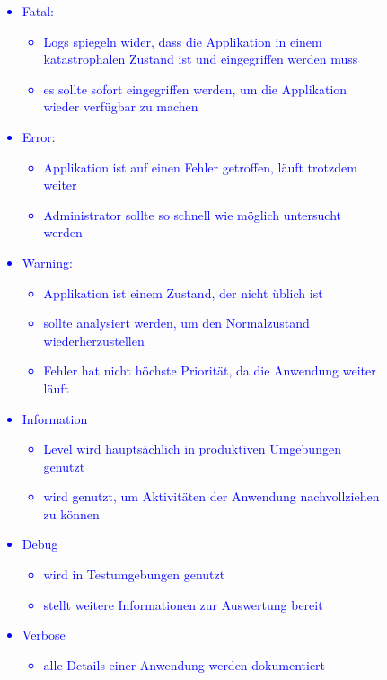 \begin{figure}[!h]
    \centering
    \textcolor{blue}{
        \begin{itemize}
            \item Fatal:
            \begin{itemize}
                \item Logs spiegeln wider, dass die Applikation in einem katastrophalen Zustand ist und eingegriffen werden muss
                \item es sollte sofort eingegriffen werden, um die Applikation wieder verfügbar zu machen
            \end{itemize}
            \item Error:
            \begin{itemize}
                \item Applikation ist auf einen Fehler getroffen, läuft trotzdem weiter
                \item Administrator sollte so schnell wie möglich untersucht werden
            \end{itemize}
            \item Warning:
            \begin{itemize}
                \item Applikation ist einem Zustand, der nicht üblich ist
                \item sollte analysiert werden, um den Normalzustand wiederherzustellen
                \item Fehler hat nicht höchste Priorität, da die Anwendung weiter läuft
            \end{itemize}
            \item Information
            \begin{itemize}
                \item Level wird hauptsächlich in produktiven Umgebungen genutzt
                \item wird genutzt, um Aktivitäten der Anwendung nachvollziehen zu können
            \end{itemize}
            \item Debug
            \begin{itemize}
                \item wird in Testumgebungen genutzt
                \item stellt weitere Informationen zur Auswertung bereit
            \end{itemize}
            \item Verbose
            \begin{itemize}
                \item alle Details einer Anwendung werden dokumentiert\autocite{ait}
            \end{itemize}
        \end{itemize}}\label{fig:figure4}
\end{figure}
